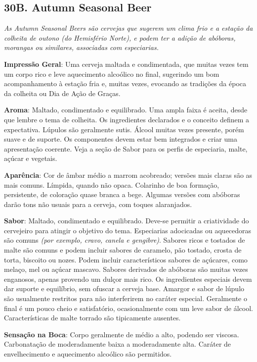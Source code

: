 \subsection*{30B. Autumn Seasonal Beer}
\textit{As Autumn Seasonal Beers são cervejas que sugerem um clima frio e a estação da colheita de outono (do Hemisfério Norte), e podem ter a adição de abóboras, morangas ou similares, associadas com especiarias.}

\textbf{Impressão Geral}: Uma cerveja maltada e condimentada, que muitas vezes tem um corpo rico e leve aquecimento alcoólico no final, sugerindo um bom acompanhamento à estação fria e, muitas vezes, evocando as tradições da época da colheita ou Dia de Ação de Graças.

\textbf{Aroma}: Maltado, condimentado e equilibrado. Uma ampla faixa é aceita, desde que lembre o tema de colheita. Os ingredientes declarados e o conceito definem a expectativa. Lúpulos são geralmente sutis. Álcool muitas vezes presente, porém suave e de suporte. Os componentes devem estar bem integrados e criar uma apresentação coerente. Veja a seção de Sabor para os perfis de especiaria, malte, açúcar e vegetais.

\textbf{Aparência}: Cor de âmbar médio a marrom acobreado; versões mais claras são as mais comuns. Límpida, quando não opaca. Colarinho de boa formação, persistente, de coloração quase branca a bege. Algumas versões com abóboras darão tons não usuais para a cerveja, com toques alaranjados.

\textbf{Sabor}: Maltado, condimentado e equilibrado. Deve-se permitir a criatividade do cervejeiro para atingir o objetivo do tema. Especiarias adocicadas ou aquecedoras são comuns \textit{(por exemplo, cravo, canela e gengibre)}. Sabores ricos e tostados de malte são comuns e podem incluir sabores de caramelo, pão tostado, crosta de torta, biscoito ou nozes. Podem incluir característicos sabores de açúcares, como melaço, mel ou açúcar mascavo. Sabores derivados de abóboras são muitas vezes enganosos, apenas provendo um dulçor mais rico. Os ingredientes especiais devem dar suporte e equilíbrio, sem ofuscar a cerveja base. Amargor e sabor de lúpulo são usualmente restritos para não interferirem no caráter especial. Geralmente o final é um pouco cheio e satisfatório, ocasionalmente com um leve sabor de álcool. Características de malte torrado são tipicamente ausentes.

\textbf{Sensação na Boca}: Corpo geralmente de médio a alto, podendo ser viscosa. Carbonatação de moderadamente baixa a moderadamente alta. Caráter de envelhecimento e aquecimento alcoólico são permitidos.

